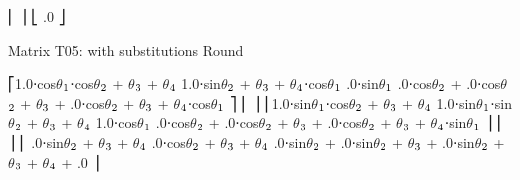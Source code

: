 \documentclass[letterpaper,10pt,english,openany,oneside]{sphinxmanual}
\begin{document}
\begin{sphinxVerbatim}[commandchars=\\\{\}]
⎢                                                                                                                                                     ⎥
⎣                                                                                                            .0                                   ⎦


Matrix T\PYGZus{}0\PYGZus{}5: with substitutions Round

⎡1.0⋅cos\(\theta\)\(\sb{\text{1}}\)⋅cos\(\theta\)\(\sb{\text{2}}\) + \(\theta\)\(\sb{\text{3}}\) + \(\theta\)\(\sb{\text{4}}\)  \PYGZhy{}1.0⋅sin\(\theta\)\(\sb{\text{2}}\) + \(\theta\)\(\sb{\text{3}}\) + \(\theta\)\(\sb{\text{4}}\)⋅cos\(\theta\)\(\sb{\text{1}}\)  .0⋅sin\(\theta\)\(\sb{\text{1}}\)   .0⋅cos\(\theta\)\(\sb{\text{2}}\) + .0⋅cos\(\theta\)\(\sb{\text{2}}\) + \(\theta\)\(\sb{\text{3}}\) + .0⋅cos\(\theta\)\(\sb{\text{2}}\) + \(\theta\)\(\sb{\text{3}}\) + \(\theta\)\(\sb{\text{4}}\)⋅cos\(\theta\)\(\sb{\text{1}}\)    ⎤
⎢                                                                                                                                                   ⎥
⎢1.0⋅sin\(\theta\)\(\sb{\text{1}}\)⋅cos\(\theta\)\(\sb{\text{2}}\) + \(\theta\)\(\sb{\text{3}}\) + \(\theta\)\(\sb{\text{4}}\)  \PYGZhy{}1.0⋅sin\(\theta\)\(\sb{\text{1}}\)⋅sin\(\theta\)\(\sb{\text{2}}\) + \(\theta\)\(\sb{\text{3}}\) + \(\theta\)\(\sb{\text{4}}\)  \PYGZhy{}1.0⋅cos\(\theta\)\(\sb{\text{1}}\)  .0⋅cos\(\theta\)\(\sb{\text{2}}\) + .0⋅cos\(\theta\)\(\sb{\text{2}}\) + \(\theta\)\(\sb{\text{3}}\) + .0⋅cos\(\theta\)\(\sb{\text{2}}\) + \(\theta\)\(\sb{\text{3}}\) + \(\theta\)\(\sb{\text{4}}\)⋅sin\(\theta\)\(\sb{\text{1}}\)    ⎥
⎢                                                                                                                                                   ⎥
⎢    .0⋅sin\(\theta\)\(\sb{\text{2}}\) + \(\theta\)\(\sb{\text{3}}\) + \(\theta\)\(\sb{\text{4}}\)          .0⋅cos\(\theta\)\(\sb{\text{2}}\) + \(\theta\)\(\sb{\text{3}}\) + \(\theta\)\(\sb{\text{4}}\)                     .0⋅sin\(\theta\)\(\sb{\text{2}}\) + .0⋅sin\(\theta\)\(\sb{\text{2}}\) + \(\theta\)\(\sb{\text{3}}\) + .0⋅sin\(\theta\)\(\sb{\text{2}}\) + \(\theta\)\(\sb{\text{3}}\) + \(\theta\)\(\sb{\text{4}}\) + .0   ⎥

\end{sphinxVerbatim}
\end{document}
